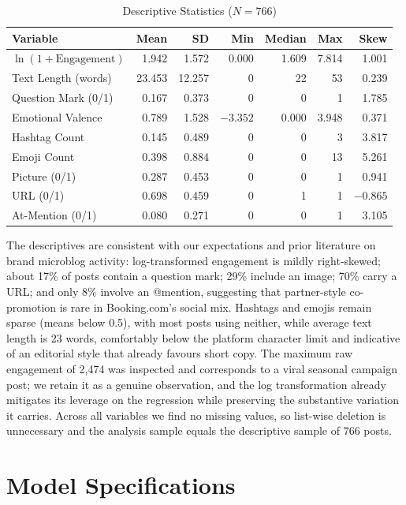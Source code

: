 \documentclass[12pt,a4paper]{article}
\begin{document}
\begin{table}[H]
\centering\small
\caption{Descriptive Statistics ($N=766$)}
\begin{tabular}{lrrrrrr}
\toprule
Variable & Mean & SD & Min & Median & Max & Skew \\
\midrule
$\ln(1+\text{Engagement})$ & 1.942 & 1.572 & 0.000 & 1.609 & 7.814 & 1.001 \\
Text Length (words) & 23.453 & 12.257 & 0 & 22 & 53 & 0.239 \\
Question Mark (0/1) & 0.167 & 0.373 & 0 & 0 & 1 & 1.785 \\
Emotional Valence & 0.789 & 1.528 & $-3.352$ & 0.000 & 3.948 & 0.371 \\
Hashtag Count & 0.145 & 0.489 & 0 & 0 & 3 & 3.817 \\
Emoji Count & 0.398 & 0.884 & 0 & 0 & 13 & 5.261 \\
Picture (0/1) & 0.287 & 0.453 & 0 & 0 & 1 & 0.941 \\
URL (0/1) & 0.698 & 0.459 & 0 & 1 & 1 & $-0.865$ \\
At-Mention (0/1) & 0.080 & 0.271 & 0 & 0 & 1 & 3.105 \\
\bottomrule
\end{tabular}
\end{table}

The descriptives are consistent with our expectations and prior literature on brand microblog activity: log-transformed engagement is mildly right-skewed; about 17\% of posts contain a question mark; 29\% include an image; 70\% carry a URL; and only 8\% involve an @mention, suggesting that partner-style co-promotion is rare in Booking.com's social mix. Hashtags and emojis remain sparse (means below 0.5), with most posts using neither, while average text length is 23 words, comfortably below the platform character limit and indicative of an editorial style that already favours short copy. The maximum raw engagement of 2{,}474 was inspected and corresponds to a viral seasonal campaign post; we retain it as a genuine observation, and the log transformation already mitigates its leverage on the regression while preserving the substantive variation it carries. Across all variables we find no missing values, so list-wise deletion is unnecessary and the analysis sample equals the descriptive sample of 766 posts.

\section{Model Specifications}
\end{document}
